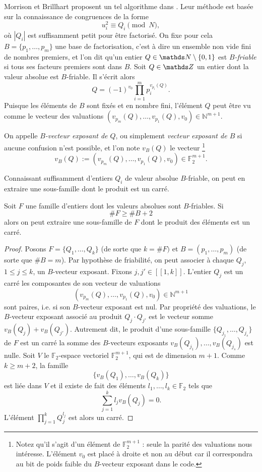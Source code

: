 Morrison et Brillhart proposent un tel algorithme dans \cite{MB}. Leur méthode
est basée sur la connaissance de congruences de la forme \[u_i^2 \equiv Q_i
\pmod{N},\] où $| Q_i |$ est suffisamment petit pour être factorisé. On fixe
pour cela $B = \{p_1, \dots, p_m\}$ une base de factorisation, c'est à dire un
ensemble non vide fini de nombres premiers, et l'on dit qu'un entier $Q\in
\N\setminus \{0, 1\}$ est \emph{$B$-friable} si tous ses facteurs premiers sont
dans $B$. Soit $Q\in \Z$ un entier dont la valeur absolue est $B$-friable. Il
s'écrit alors \[Q = (-1)^{v_0}\prod_{i=1}^m p_i^{v_{p_i}(Q)}.\] Puisque les
éléments de $B$ sont fixés et en nombre fini, l'élément $Q$ peut être vu comme
le vecteur des valuations $(v_{p_m}(Q), \dots, v_{p_1}(Q), v_0 ) \in
\mathbb{N}^{m+1}$.

\begin{definition}
	On appelle \emph{$B$-vecteur exposant de $Q$}, ou simplement \emph{vecteur
	exposant de $B$} si aucune confusion n'est possible, et l'on note $v_B(Q)$
	le vecteur \footnote{Notez qu'il s'agit d'un élément de
	$\mathbb{F}_2^{m+1}$ : seule la parité des valuations nous intéresse.
	L'élément $v_0$ est placé à droite et non au début car il correspondra au
	bit de poids faible du $B$-vecteur exposant dans le code.} \[v_B(Q) :=
	(v_{p_m}(Q), \dots, v_{p_1}(Q), v_0 ) \in \mathbb{F}_2^{m+1}.\] 
\end{definition}

Connaissant suffisamment d'entiers $Q_i$ de valeur absolue $B$-friable, on peut
en extraire une sous-famille dont le produit est un carré.

\begin{proposition}
	Soit $F$ une famille d'entiers dont les valeurs absolues sont $B$-friables.
	Si \[\# F \geqslant \# B + 2\] alors on peut extraire une sous-famille de
	$F$ dont le produit des éléments est un carré.
\end{proposition}

\begin{proof}
	Posons $F = \{Q_1, \dots, Q_k\}$ (de sorte que $k = \# F)$ et $B = (p_1,
	\dots, p_m)$ (de sorte que $\# B = m$). Par hypothèse de friabilité, on
	peut associer à chaque $Q_j$, $1\leqslant j \leqslant k$, un $B$-vecteur
	exposant. Fixons $j, j'\in [\![1,k]\!]$. L'entier $Q_j$ est un carré \ssi
	les composantes de son vecteur de valuations \[(v_{p_m}(Q), \dots,
	v_{p_1}(Q), v_0 ) \in \mathbb{N}^{m+1}\] sont paires, i.e. si son
	$B$-vecteur exposant est nul. Par propriété des valuations, le $B$-vecteur
	exposant associé au produit $Q_j\cdot Q_{j'}$ est le vecteur somme
	$v_B(Q_j) + v_B(Q_{j'})$. Autrement dit, le produit d'une sous-famille
	$\{Q_{j_1}, \dots, Q_{j_s}\}$ de $F$ est un carré \ssi la somme des
	$B$-vecteurs exposants $v_B(Q_{j_1}), \dots, v_B(Q_{j_s})$ est nulle. Soit
	$V$ le $\mathbb{F}_2$-espace vectoriel $\mathbb{F}_2^{m+1}$, qui est de
	dimension $m+1$. Comme $k\geqslant m+2$, la famille \[\{v_B(Q_1), \dots,
	v_B(Q_k)\}\] est liée dans $V$ et il existe de fait des éléments $l_1,\dots,
	l_k\in \mathbb{F}_2$ tels que \[\sum_{j=1}^k l_j v_B(Q_j) = 0.\] L'élément
	$\prod_{j=1}^k Q_j^{l_j}$ est alors un carré.
\end{proof}

